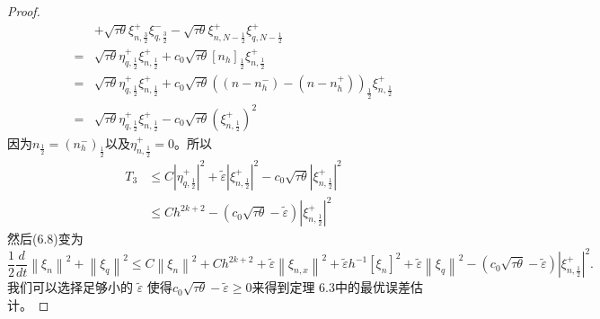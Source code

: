 \begin{proof}
$$\begin{aligned}
                   & +\sqrt{\tau \theta} \xi_{n, \frac{3}{2}}^{+} \xi_{q, \frac{3}{2}}^{-}-\sqrt{\tau \theta} \xi_{n, N-\frac{1}{2}}^{+} \xi_{q, N-\frac{1}{2}}^{+}                                                                                                                                                     \\
            =      & \sqrt{\tau \theta} \eta_{q, \frac{1}{2}}^{+} \xi_{n, \frac{1}{2}}^{+}+c_{0} \sqrt{\tau \theta}\left[n_{h}\right]_{\frac{1}{2}} \xi_{n, \frac{1}{2}}^{+}                                                                                                                                            \\
            =      & \sqrt{\tau \theta} \eta_{q, \frac{1}{2}}^{+} \xi_{n, \frac{1}{2}}^{+}+c_{0} \sqrt{\tau \theta}\left(\left(n-n_{h}^{-}\right)-\left(n-n_{h}^{+}\right)\right)_{\frac{1}{2}} \xi_{n, \frac{1}{2}}^{+}                                                                                                \\
            =      & \sqrt{\tau \theta} \eta_{q, \frac{1}{2}}^{+} \xi_{n, \frac{1}{2}}^{+}-c_{0} \sqrt{\tau \theta}\left(\xi_{n, \frac{1}{2}}^{+}\right)^{2}
        \end{aligned}
    $$
    因为$n_{\frac{1}{2}}=\left(n_{h}^{-}\right)_{\frac{1}{2}}$以及$\eta_{n, \frac{1}{2}}^{+}=0$。所以
    $$
        \begin{aligned}
            T_{3} & \leq C\left|\eta_{q, \frac{1}{2}}^{+}\right|^{2}+\tilde{\varepsilon}\left|\xi_{n, \frac{1}{2}}^{+}\right|^{2}-c_{0} \sqrt{\tau \theta}\left|\xi_{n, \frac{1}{2}}^{+}\right|^{2} \\
                  & \leq C h^{2 k+2}-\left(c_{0} \sqrt{\tau \theta}-\tilde{\varepsilon}\right)\left|\xi_{n, \frac{1}{2}}^{+}\right|^{2}
        \end{aligned}
    $$
    然后(6.8)变为
    \begin{equation}
        \frac{1}{2} \frac{d}{d t}\left\|\xi_{n}\right\|^{2}+\left\|\xi_{q}\right\|^{2} \leq C\left\|\xi_{n}\right\|^{2}+C h^{2 k+2}+\tilde{\varepsilon}\left\|\xi_{n, x}\right\|^{2}+\tilde{\varepsilon} h^{-1}\left[\xi_{n}\right]^{2}+\tilde{\varepsilon}\left\|\xi_{q}\right\|^{2}-\left(c_{0} \sqrt{\tau \theta}-\tilde{\varepsilon}\right)\left|\xi_{n, \frac{1}{2}}^{+}\right|^{2}.
    \end{equation}
    我们可以选择足够小的 $\tilde{\varepsilon}$ 使得$c_{0} \sqrt{\tau \theta}-\tilde{\varepsilon} \geq 0$来得到定理 6.3中的最优误差估计。
\end{proof}
